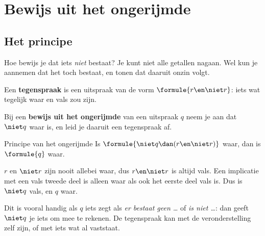 \section{Bewijs uit het ongerijmde}\label{sec:h2-ongerijmde}

\subsection{Het principe}

Hoe bewijs je dat iets \textit{niet} bestaat? Je kunt niet alle getallen nagaan. Wel kun je aannemen dat het toch bestaat, en tonen dat daaruit onzin volgt.

\begin{theorie}
Een \textbf{\textcolor{accent}{tegenspraak}} is een uitspraak van de vorm $\formule{r \en \niet r}$: iets wat tegelijk waar en vals zou zijn.

\vspace{1mm}
Bij een \textbf{\textcolor{accent}{bewijs uit het ongerijmde}} van een uitspraak $q$ neem je aan dat $\niet q$ waar is, en leid je daaruit een tegenspraak af.

\begin{stelling}{Principe van het ongerijmde}
Is $\formule{\niet q \dan (r \en \niet r)}$ waar, dan is $\formule{q}$ waar.
\end{stelling}

\begin{bewijs}
$r$ en $\niet r$ zijn nooit allebei waar, dus $r \en \niet r$ is altijd vals. Een implicatie met een vals tweede deel is alleen waar als ook het eerste deel vals is. Dus is $\niet q$ vals, en $q$ waar.
\end{bewijs}
\end{theorie}

Dit is vooral handig als $q$ iets zegt als \textit{er bestaat geen \ldots} of \textit{is niet \ldots}: dan geeft $\niet q$ je iets om mee te rekenen. De tegenspraak kan met de veronderstelling zelf zijn, of met iets wat al vaststaat.


